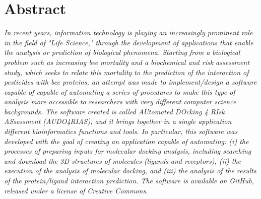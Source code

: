 \chapter*{\centering Abstract}
\pagestyle{plain}
\begin{adjustwidth}{25pt}{25pt}
\fontsize{18pt}{14pt}\selectfont
\textit{In recent years, information technology is playing an increasingly prominent role in the field of "Life Science," through the development of applications that enable the analysis or prediction of biological phenomena. Starting from a biological problem such as increasing bee mortality and a biochemical and risk assessment study, which seeks to relate this mortality to the prediction of the interaction of pesticides with bee proteins, an attempt was made to implement/design a software capable of capable of automating a series of procedures to make this type of analysis more accessible to researchers with very different computer science backgrounds. The software created is called AUtomated DOcking 4 RIsk ASsessment (AUDO4RIAS), and it brings together in a single application different bioinformatics functions and tools. In particular, this software was developed with the goal of creating an application capable of automating: (i) the processes of preparing inputs for molecular docking analysis, including searching and download the 3D structures of molecules (ligands and receptors), (ii) the execution of the analysis of molecular docking, and (iii) the analysis of the results of the protein/ligand interaction prediction. The software is available on GitHub, released under a license of Creative Commons.}
\end{adjustwidth}